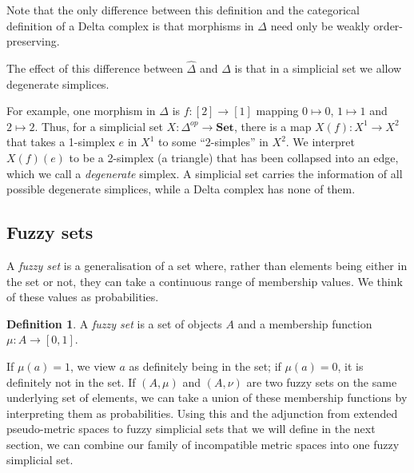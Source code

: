\documentclass[a4paper,11pt,leqno]{article} \usepackage{amsmath}
\theoremstyle{definition}
\newtheorem{defn}{Definition}
\begin{document}
Note that the only difference between this definition and the categorical
definition of a Delta complex is that morphisms in $\Delta$ need only be weakly
order-preserving.

The effect of this difference between $\hat{\Delta}$ and $\Delta$ is that in
a simplicial set we allow degenerate simplices.

For example, one morphism in $\Delta$ is $f:[2]\to[1]$ mapping $0\mapsto 0$,
$1\mapsto 1$ and $2\mapsto 2$.
Thus, for a simplicial set $X: \Delta^{op}\to\textbf{Set}$, there is a map
$X(f): X^1\to X^2$ that takes a 1-simplex $e$ in $X^1$ to some ``2-simples'' in
$X^2$.
We interpret $X(f)(e)$ to be a 2-simplex (a triangle) that has been collapsed
into an edge, which we call a \emph{degenerate} simplex.
A simplicial set carries the information of all possible degenerate simplices,
while a Delta complex has none of them.

\subsection{Fuzzy sets}

A \emph{fuzzy set} is a generalisation of a set where, rather than elements
being either in the set or not, they can take a continuous range of membership
values.
We think of these values as probabilities.

\begin{defn}
  A \emph{fuzzy set} is a set of objects $A$ and a membership function $\mu:
  A\to [0, 1]$.
\end{defn}

If $\mu(a) = 1$, we view $a$ as definitely being in the set; if $\mu(a) = 0$,
it is definitely not in the set.
If $(A, \mu)$ and $(A, \nu)$ are two fuzzy sets on the same underlying set of
elements, we can take a union of these membership functions by interpreting
them as probabilities.
Using this and the adjunction from extended pseudo-metric spaces to fuzzy
simplicial sets that we will define in the next section, we can combine our
family of incompatible metric spaces into one fuzzy simplicial set.
\end{document}
